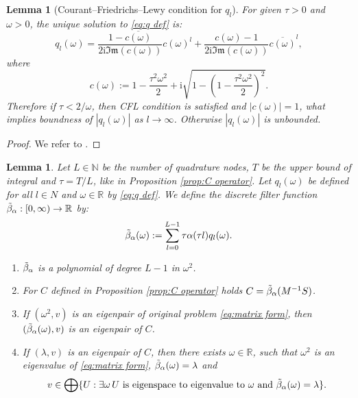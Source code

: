 \documentclass[a4paper,11pt,bibliography=totoc,listof=totoc,headinclude=true,cleardoublepage=empty,oneside]{scrbook}
\newtheorem{lemma}[theorem]{Lemma}
\newcommand{\R}{\mathbb{R}}
\newcommand{\N}{\mathbb{N}}
\renewcommand{\i}{\mathrm{i}}
\renewcommand{\Im}{\mathfrak{Im}}
\newcommand{\dff}{\Tilde{\beta}_\alpha}
\begin{document}
\begin{lemma}[Courant--Friedrichs--Lewy condition for $q_l$]
    For given $\tau > 0$ and $\omega > 0$, the unique solution to \eqref{eq:q def} is:
    \begin{equation*}
        q_l(\omega) = \frac{1 - \overline{c(\omega)}}{2\i \Im(c(\omega))} c(\omega)^l + \frac{c(\omega)-1}{2\i \Im(c(\omega))} \overline{c(\omega)}^l,
    \end{equation*}
    where 
    \begin{equation*}
        c(\omega) := 1 - \frac{\tau^2 \omega^2}{2} + \i \sqrt{1 - \left(1 - \frac{\tau^2 \omega^2}{2}\right)^2}.
    \end{equation*}
    Therefore if $\tau < 2/\omega$, then CFL condition is satisfied and $|c(\omega)|=1$, what implies boundness of $|q_l(\omega)|$ as $l \rightarrow \infty$. Otherwise $|q_l(\omega)|$ is unbounded.
\end{lemma}
\begin{proof}
    We refer to \cite[p. 6]{nannen}.
\end{proof}
\begin{lemma}\label{lemma:dff}
    Let $L\in \N$ be the number of quadrature nodes, $T$ be the upper bound of integral and $\tau = T/L$, like in Proposition \ref{prop:C operator}. Let $q_l(\omega)$ be defined for all $l \in N$ and $\omega \in \R$ by \eqref{eq:q def}. We define the discrete filter function $\dff: [0, \infty) \rightarrow \R$ by:
    \begin{equation*}
        \dff(\omega) := \sum_{l=0}^{L-1} \tau \alpha(\tau l) q_l(\omega).
    \end{equation*}
    \begin{enumerate}
        \item $\dff$ is a polynomial of degree $L-1$ in $\omega^2$.
        \item For $C$ defined in Proposition \ref{prop:C operator} holds $C = \dff(M^{-1}S)$.
        \item If $(\omega^2, v)$ is an eigenpair of original problem \eqref{eq:matrix form}, then $(\dff(\omega), v)$ is an eigenpair of $C$.
        \item If $(\lambda, v)$ is an eigenpair of $C$, then there exists $\omega \in \R$, such that $\omega^2$ is an eigenvalue of \eqref{eq:matrix form}, $\dff(\omega)=\lambda$ and
        \begin{equation*}
            v \in \bigoplus\{ U : \exists \omega \, U \text{ is eigenspace to eigenvalue to } \omega \text{ and } \dff(\omega) = \lambda\}.
        \end{equation*}
    \end{enumerate}
\end{lemma}
\end{document}
